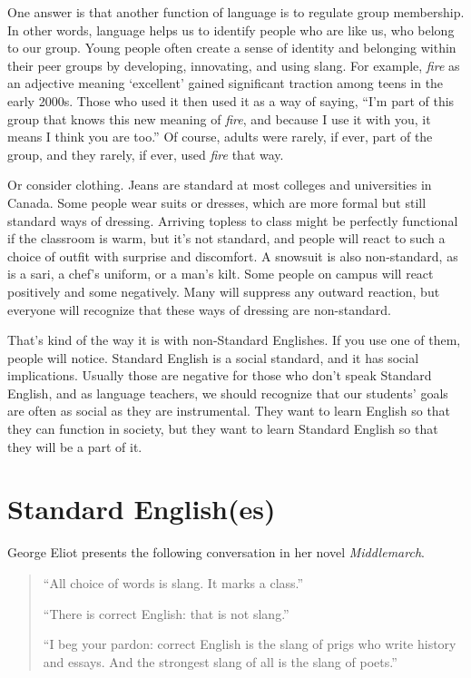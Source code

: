 One answer is that another function of language is to regulate group membership. In other words, language helps us to identify people who are like us, who belong to our group. Young people often create a sense of identity and belonging within their peer groups by developing, innovating, and using slang. For example, \textit{fire} as an adjective meaning `excellent' gained significant traction among teens in the early 2000s. Those who used it then used it as a way of saying, ``I'm part of this group that knows this new meaning of \textit{fire}, and because I use it with you, it means I think you are too.'' Of course, adults were rarely, if ever, part of the group, and they rarely, if ever, used \textit{fire} that way.

Or consider clothing. Jeans are standard at most colleges and universities in Canada. Some people wear suits or dresses, which are more formal but still standard ways of dressing. Arriving topless to class might be perfectly functional if the classroom is warm, but it's not standard, and people will react to such a choice of outfit with surprise and discomfort. A snowsuit is also non-standard, as is a sari, a chef's uniform, or a man's kilt. Some people on campus will react positively and some negatively. Many will suppress any outward reaction, but everyone will recognize that these ways of dressing are non-standard.

That's kind of the way it is with non-Standard Englishes. If you use one of them, people will notice. Standard English is a social standard, and it has social implications. Usually those are negative for those who don't speak Standard English, and as language teachers, we should recognize that our students' goals are often as social as they are instrumental. They want to learn English so that they can function in society, but they want to learn Standard English so that they will be a part of it.


\section{Standard English(es)}\label{sec:standard}

George Eliot presents the following conversation in her novel \textit{Middlemarch}.

\begin{quote}
    ``All choice of words is slang. It marks a class.''

    ``There is correct English: that is not slang.''

    ``I beg your pardon: correct English is the slang of prigs who write history and essays. And the strongest slang of all is the slang of poets.''
\end{quote}


